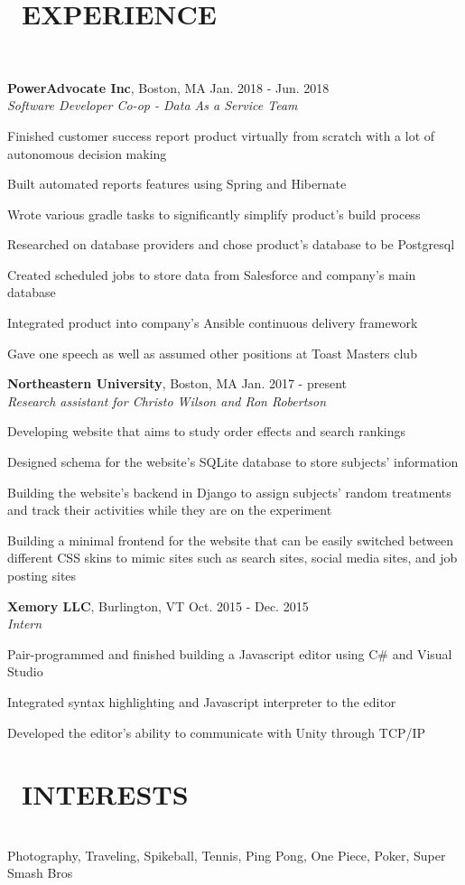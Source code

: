 \documentclass[11pt]{res}
\newcommand{\sectionunderline}{\vspace{-3mm}\hrulefill\\}
\newcommand{\newsect}[1]{\section{\Large \bf #1}}
\begin{document}
\begin{resume}
  \newsect{\faUsers\ EXPERIENCE}{
    \sectionunderline{
      {\bf PowerAdvocate Inc}, Boston, MA \hfill Jan. 2018 - Jun. 2018\\
      {\it Software Developer Co-op - Data As a Service Team}
      \begin{itemize}
        {\item Finished customer success report product virtually from scratch with a lot of autonomous decision making}
        {\item Built automated reports features using Spring and Hibernate}
        {\item Wrote various gradle tasks to significantly simplify product's build process}
        {\item Researched on database providers and chose product's database to be Postgresql}
        {\item Created scheduled jobs to store data from Salesforce and company's main database}
        {\item Integrated product into company's Ansible continuous delivery framework}
        {\item Gave one speech as well as assumed other positions at Toast Masters club}
      \end{itemize}

      {\bf Northeastern University}, Boston, MA \hfill Jan. 2017 - present\\
      {\it Research assistant for Christo Wilson and Ron Robertson}
      \begin{itemize}
        {\item Developing website that aims to study order effects and search rankings}
        {\item Designed schema for the website's SQLite database to store subjects' information}
        {\item Building the website's backend in Django to assign subjects' random treatments and track their activities while they are on the experiment}
        {\item Building a minimal frontend for the website that can be easily switched between different CSS skins to mimic sites such as search sites, social media sites, and job posting sites}
      \end{itemize}

      {\bf Xemory LLC}, Burlington, VT \hfill Oct. 2015 - Dec. 2015\\
      {\it Intern}
      \begin{itemize}
        {\item Pair-programmed and finished building a Javascript editor using C\# and Visual Studio}
        {\item Integrated syntax highlighting and Javascript interpreter to the editor}
        {\item Developed the editor's ability to communicate with Unity through TCP/IP}
      \end{itemize}
    }
  }

  \newsect{\faCamera\ INTERESTS}{
    \sectionunderline{
      Photography, Traveling, Spikeball, Tennis, Ping Pong, One Piece, Poker, Super Smash Bros
    }
  }
\end{resume}
\end{document}
